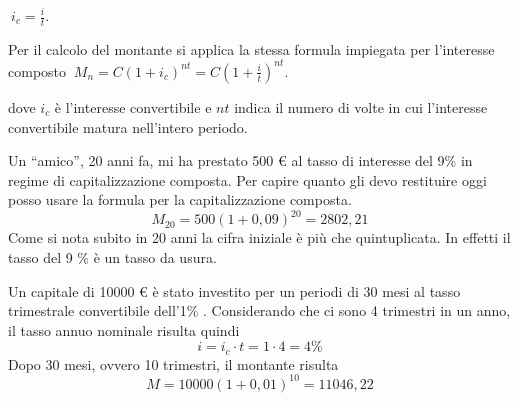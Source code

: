 $\ i_c = \frac{i}{t}$.

Per il calcolo del montante si applica la stessa formula impiegata per 
l'interesse composto $\ M_n = C (1+i_c)^{nt} = C 
\left(1+\frac{i}{t}\right)^{nt}$.

dove $i_c$ è l'interesse convertibile e $nt$ indica il numero di volte in cui 
l'interesse convertibile matura nell'intero periodo.

\begin{exrig} \begin{esempio} Un ``amico'', 20 anni fa, mi ha prestato 500 € al 
tasso di interesse del 9\% in regime di capitalizzazione composta. Per capire 
quanto gli devo restituire oggi posso usare la formula per la capitalizzazione 
composta. $$M_{20} = 500(1+0,09)^{20} = 2802,21$$ Come si nota subito in 20 anni 
la cifra iniziale è più che quintuplicata. In effetti il tasso del 9 \% è un 
tasso da usura. \end{esempio} \begin{esempio} Un capitale di 10000 € è stato 
investito per un periodi di 30 mesi al tasso trimestrale convertibile dell'1\% . 
Considerando che ci sono 4 trimestri in un anno, il tasso annuo nominale risulta 
quindi $$i=i_c\cdot t=1\cdot 4=4\%$$ Dopo 30 mesi, ovvero 10 trimestri, il 
montante risulta $$M=10000(1+0,01)^{10}=11046,22$$ \end{esempio} \end{exrig}

